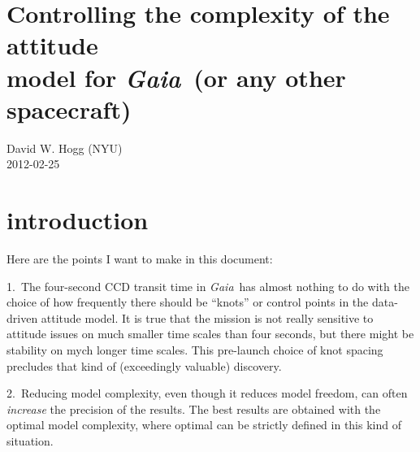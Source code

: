 \documentclass[12pt]{article}
\newcommand{\project}[1]{\textsl{#1}}
\newcommand{\gaia}{\project{Gaia}}
\begin{document}
\sloppy\sloppypar\raggedbottom

\section*{Controlling the complexity of the attitude\\
  model for \gaia\ (or any other spacecraft)}

\noindent
David W. Hogg (NYU) \\
2012-02-25

\begin{abstract}
A data-driven model of spacecraft attitude is a key component of the
\gaia\ data analysis pipeline.  On-board drift scanning effectively
removes attitude information on time scales shorter than a few
seconds, but beyond that it is not known how much freedom must be
given to the attitude model; a bad choice of model complexity will
reduce the precision of the final astrometric catalog through either
over-fitting or under-fitting.  I propose three different
parameterizations for the model complexity, and two different methods
for setting the complexity parameter objectively using the data
themselves.  The simplest model-complexity parameter I propose is the
time-spacing of a set of knots for an attitude spline and the simplest
method for setting the complexity I propose is leave-one-out
cross-validation.  I show with toy simulated \gaia-like experiments
that all of my proposed methods out-perform any model complexity
choice established by hand or heuristically; that is, my proposals are
expected to out-perform the default \gaia\ data pipeline plan.
\end{abstract}

\section{introduction}
Here are the points I want to make in this document:

1.~The four-second CCD transit time in \gaia\ has almost nothing to do
with the choice of how frequently there should be ``knots'' or control
points in the data-driven attitude model.  It is true that the mission
is not really sensitive to attitude issues on much smaller time scales
than four seconds, but there might be stability on mych longer time
scales.  This pre-launch choice of knot spacing precludes that kind of
(exceedingly valuable) discovery.

2.~Reducing model complexity, even though it reduces model freedom,
can often \emph{increase} the precision of the results.  The best
results are obtained with the optimal model complexity, where optimal
can be strictly defined in this kind of situation.
\end{document}
